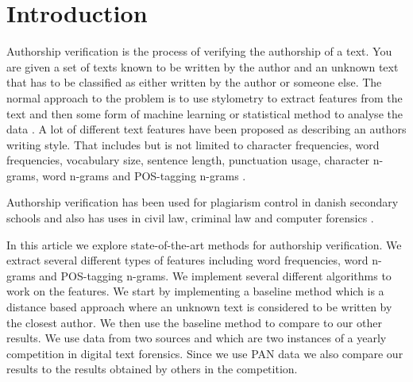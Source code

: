 \section{Introduction} \label{sec:introduction}
Authorship verification is the process of verifying the authorship of a text.
You are given a set of texts known to be written by the author and an unknown
text that has to be classified as either written by the author or someone else.
The normal approach to the problem is to use stylometry to extract features
from the text and then some form of machine learning or statistical method to
analyse the data \cite{stamatos2009}. A lot of different text features have
been proposed as describing an authors writing style. That includes but is not
limited to character frequencies, word frequencies, vocabulary size, sentence
length, punctuation usage, character n-grams, word n-grams and \gls{POS}-tagging
n-grams \cite{stamatos2009}.

Authorship verification has been used for plagiarism control in danish secondary
schools \cite{hansen2014} and also has uses in civil law, criminal law and
computer forensics \cite{stamatos2009}.

In this article we explore state-of-the-art methods for authorship verification.
We extract several different types of features including word frequencies, word
n-grams and \gls{POS}-tagging n-grams. We implement several different algorithms
to work on the features. We start by implementing a baseline method which is a
distance based approach where an unknown text is considered to be written by
the closest author. We then use the baseline method to compare to our other
results. We use data from two sources \cite{pan:2015} and \cite{pan:2013} which
are two instances of a yearly competition in digital text forensics. Since we
use PAN data we also compare our results to the results obtained by others in
the competition.

